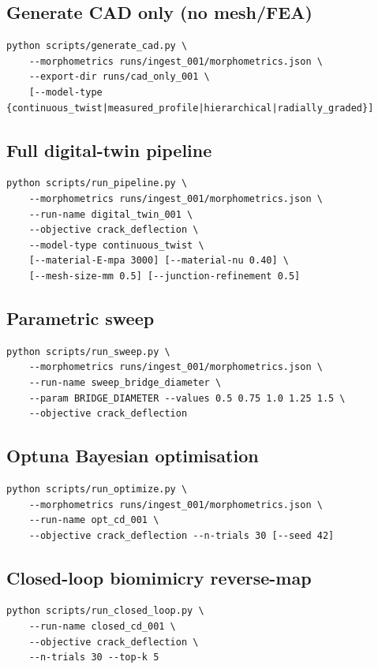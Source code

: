 \documentclass[11pt, letterpaper]{article}
\begin{document}
\subsection{Generate CAD only (no mesh/FEA)}
\begin{lstlisting}
python scripts/generate_cad.py \
    --morphometrics runs/ingest_001/morphometrics.json \
    --export-dir runs/cad_only_001 \
    [--model-type {continuous_twist|measured_profile|hierarchical|radially_graded}]
\end{lstlisting}

\subsection{Full digital-twin pipeline}
\begin{lstlisting}
python scripts/run_pipeline.py \
    --morphometrics runs/ingest_001/morphometrics.json \
    --run-name digital_twin_001 \
    --objective crack_deflection \
    --model-type continuous_twist \
    [--material-E-mpa 3000] [--material-nu 0.40] \
    [--mesh-size-mm 0.5] [--junction-refinement 0.5]
\end{lstlisting}

\subsection{Parametric sweep}
\begin{lstlisting}
python scripts/run_sweep.py \
    --morphometrics runs/ingest_001/morphometrics.json \
    --run-name sweep_bridge_diameter \
    --param BRIDGE_DIAMETER --values 0.5 0.75 1.0 1.25 1.5 \
    --objective crack_deflection
\end{lstlisting}

\subsection{Optuna Bayesian optimisation}
\begin{lstlisting}
python scripts/run_optimize.py \
    --morphometrics runs/ingest_001/morphometrics.json \
    --run-name opt_cd_001 \
    --objective crack_deflection --n-trials 30 [--seed 42]
\end{lstlisting}

\subsection{Closed-loop biomimicry reverse-map}
\begin{lstlisting}
python scripts/run_closed_loop.py \
    --run-name closed_cd_001 \
    --objective crack_deflection \
    --n-trials 30 --top-k 5
\end{lstlisting}
\end{document}
